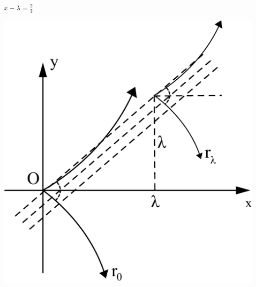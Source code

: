\documentclass[11pt]{amsbook}
\begin{document}
\begin{exmp}
\begin{hSolution}
\begin{minipage}{0.69\textwidth}
\begin{multicols}{2}
\begin{hEnumerateRoman}
					\item
					\begin{center}
						$x - \lambda = \frac{2}{3}$
					\end{center}
				\end{hEnumerateRoman}
			\end{multicols}
		\end{minipage}
		\begin{minipage}{0.31\textwidth}
			\includegraphics[width=1\textwidth, keepaspectratio]{images/b2p2-318-fig02}
		\end{minipage}
	\end{hSolution}

\end{exmp}
\end{document}
